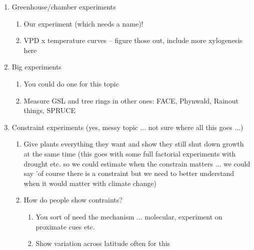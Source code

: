 \documentclass[11pt,letter]{article}
\begin{document}
\begin{enumerate}
\begin{enumerate}
\begin{enumerate}
\end{enumerate}
\item Greenhouse/chamber experiments
\begin{enumerate}
\item Our experiment (which needs a name)!
\item VPD x temperature curves -- figure those out, include more xylogenesis here
\end{enumerate}
\item Big experiments
\begin{enumerate}
\item You could do one for this topic
\item Measure GSL and tree rings in other ones: FACE, Phynwald, Rainout things, SPRUCE 
\end{enumerate}
\item Constraint experiments (yes, messy topic ... not sure where all this goes ...)
\begin{enumerate}
\item Give plants everything they want and show they still shut down growth at the same time (this goes with some full factorial experiments with drought etc. so we could estimate when the constrain matters ... we could say 'of course there is a constraint but we need to better understand when it would matter with climate change)
\item How do people show contraints?
\begin{enumerate}
\item You sort of need the mechanism ... molecular, experiment on proximate cues etc.
\item Show variation across latitude often for this
\end{enumerate}
\end{enumerate}
\end{enumerate}
\end{enumerate}
\end{document}
